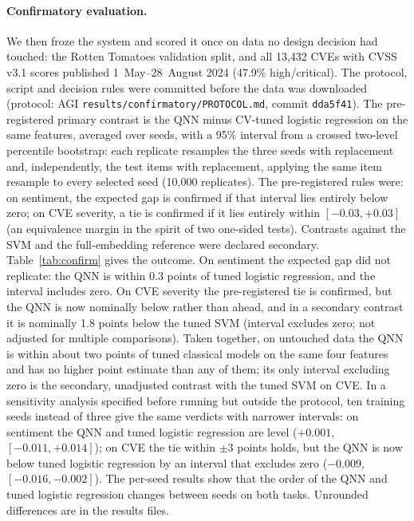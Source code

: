 \documentclass[11pt]{article}
\begin{document}
\paragraph{Confirmatory evaluation.} We then froze the system and scored it once on data no design decision had touched: the Rotten Tomatoes validation split, and all 13{,}432 CVEs with CVSS v3.1 scores published 1~May--28~August 2024 (47.9\% high/critical). The protocol, script and decision rules were committed before the data was downloaded (protocol: AGI \texttt{results/confirmatory/PROTOCOL.md}, commit \texttt{dda5f41}). The pre-registered primary contrast is the QNN minus CV-tuned logistic regression on the same features, averaged over seeds, with a 95\% interval from a crossed two-level percentile bootstrap: each replicate resamples the three seeds with replacement and, independently, the test items with replacement, applying the same item resample to every selected seed (10{,}000 replicates). The pre-registered rules were: on sentiment, the expected gap is confirmed if that interval lies entirely below zero; on CVE severity, a tie is confirmed if it lies entirely within $[-0.03, +0.03]$ (an equivalence margin in the spirit of two one-sided tests). Contrasts against the SVM and the full-embedding reference were declared secondary. Table~\ref{tab:confirm} gives the outcome. On sentiment the expected gap did not replicate: the QNN is within 0.3 points of tuned logistic regression, and the interval includes zero. On CVE severity the pre-registered tie is confirmed, but the QNN is now nominally below rather than ahead, and in a secondary contrast it is nominally 1.8 points below the tuned SVM (interval excludes zero; not adjusted for multiple comparisons). Taken together, on untouched data the QNN is within about two points of tuned classical models on the same four features and has no higher point estimate than any of them; its only interval excluding zero is the secondary, unadjusted contrast with the tuned SVM on CVE. In a sensitivity analysis specified before running but outside the protocol, ten training seeds instead of three give the same verdicts with narrower intervals: on sentiment the QNN and tuned logistic regression are level ($+0.001$, $[-0.011, +0.014]$); on CVE the tie within $\pm 3$ points holds, but the QNN is now below tuned logistic regression by an interval that excludes zero ($-0.009$, $[-0.016, -0.002]$). The per-seed results show that the order of the QNN and tuned logistic regression changes between seeds on both tasks. Unrounded differences are in the results files.
\end{document}
